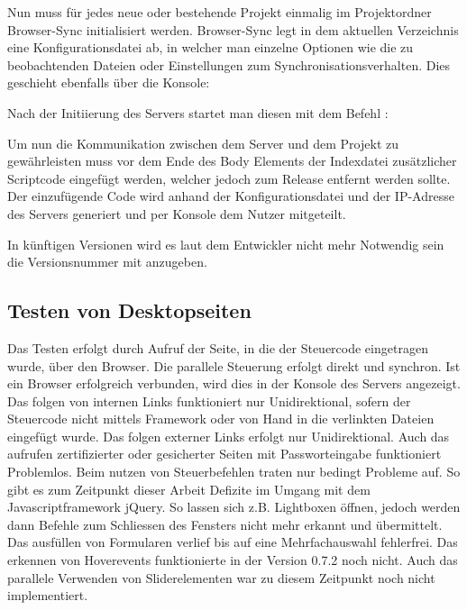 	Nun muss für jedes neue oder bestehende Projekt einmalig im Projektordner Browser-Sync initialisiert werden. Browser-Sync legt in dem aktuellen Verzeichnis eine Konfigurationsdatei ab, in welcher man einzelne Optionen wie die zu beobachtenden Dateien oder Einstellungen zum Synchronisationsverhalten. Dies geschieht ebenfalls über die Konsole:
	
	Nach der Initiierung des Servers startet man diesen mit dem Befehl :
	
	Um nun die Kommunikation zwischen dem Server und dem Projekt zu gewährleisten muss vor dem Ende des Body Elements der Indexdatei zusätzlicher Scriptcode eingefügt werden, welcher jedoch zum Release entfernt werden sollte. Der einzufügende Code  wird anhand der Konfigurationsdatei und der IP-Adresse des Servers generiert und per Konsole dem Nutzer mitgeteilt.
	
	In künftigen Versionen wird es laut dem Entwickler nicht mehr Notwendig sein die Versionsnummer mit anzugeben.
	
	\subsection{Testen von Desktopseiten}
	Das Testen erfolgt durch Aufruf der Seite, in die der Steuercode eingetragen wurde, über den Browser. Die parallele Steuerung erfolgt direkt und synchron. Ist ein Browser erfolgreich verbunden, wird dies in der Konsole des Servers angezeigt.
	Das folgen von internen Links funktioniert nur Unidirektional, sofern der Steuercode nicht mittels Framework oder von Hand in die verlinkten Dateien eingefügt wurde. Das folgen externer Links erfolgt nur Unidirektional. Auch das aufrufen zertifizierter oder gesicherter Seiten mit Passworteingabe funktioniert Problemlos. Beim nutzen von Steuerbefehlen traten nur bedingt Probleme auf. So gibt es zum Zeitpunkt dieser Arbeit Defizite im Umgang mit dem Javascriptframework jQuery. So lassen sich z.B. Lightboxen öffnen, jedoch werden dann Befehle zum Schliessen des Fensters nicht mehr erkannt und übermittelt. Das ausfüllen von Formularen verlief bis auf eine Mehrfachauswahl fehlerfrei. Das erkennen von Hoverevents funktionierte in der Version 0.7.2 noch nicht. Auch das parallele Verwenden von Sliderelementen war zu diesem Zeitpunkt noch nicht implementiert.
	

